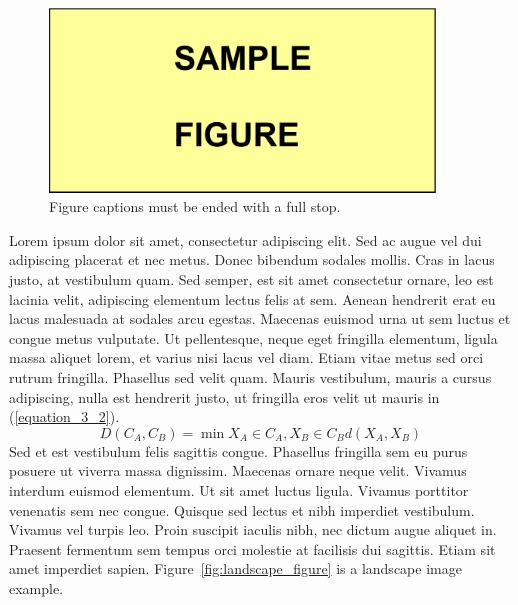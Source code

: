 \begin{figure}[!ht]
 \centering
 \includegraphics[width=290pt,keepaspectratio=true]{./fig/sekil4}
 \vspace{4mm}
 \caption{Figure captions must be ended with a full stop.}
 \label{fig:3-1-4}
\end{figure}

Lorem ipsum dolor sit amet, consectetur adipiscing elit. Sed ac augue vel dui 
adipiscing placerat et nec metus. Donec bibendum sodales mollis. Cras in lacus 
justo, at vestibulum quam. Sed semper, est sit amet consectetur ornare, leo est 
lacinia velit, adipiscing elementum lectus felis at sem. Aenean hendrerit erat eu 
lacus malesuada at sodales arcu egestas. Maecenas euismod urna ut sem luctus et 
congue metus vulputate. Ut pellentesque, neque eget fringilla elementum, ligula 
massa aliquet lorem, et varius nisi lacus vel diam. Etiam vitae metus sed orci 
rutrum fringilla. Phasellus sed velit quam. Mauris vestibulum, mauris a cursus 
adipiscing, nulla est hendrerit justo, ut fringilla eros velit ut mauris in (\ref{equation_3_2}).
\begin{equation}
    D\left(C_{A},C_{B}\right) = \min X_{A}\in C_{A},X_{B}\in C_{B} 
     d\left(X_{A},X_{B}\right)  
     \label{equation_3_2}
\end{equation}
Sed et est vestibulum felis sagittis congue. Phasellus fringilla sem eu purus 
posuere ut viverra massa dignissim. Maecenas ornare neque velit. Vivamus interdum 
euismod elementum. Ut sit amet luctus ligula. Vivamus porttitor venenatis sem nec 
congue. Quisque sed lectus et nibh imperdiet vestibulum. Vivamus vel turpis leo. 
Proin suscipit iaculis nibh, nec dictum augue aliquet in. Praesent fermentum sem 
tempus orci molestie at facilisis dui sagittis. Etiam sit amet imperdiet sapien. Figure~\ref{fig:landscape_figure} is a landscape image example.

